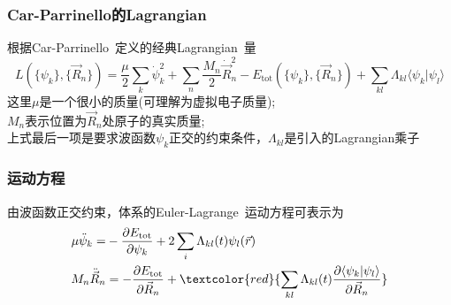 \frame
{
	\frametitle{\textrm{Car-Parrinello}的\textrm{Lagrangian}}
	根据\textrm{Car-Parrinello~}定义的经典\textrm{Lagrangian~}量
	{\fontsize{9.0pt}{5.2pt}\selectfont
	\begin{displaymath}
		L(\{\psi_k\},\{\vec R_n\})=\frac{\mu}2\sum_k\dot{\psi}_k^2+\sum_n\frac{M_n}2\dot{\vec R}_n^2-E_{\mathrm{tot}}(\{\psi_k\},\{\vec R_n\})+\sum_{kl}\Lambda_{kl}\langle\psi_k|\psi_l\rangle
	\end{displaymath}}
	这里$\mu$是一个很小的质量(可理解为虚拟电子质量);\\
	$M_n$表示位置为$\vec R_n$处原子的真实质量;~\\
	上式最后一项是要求波函数$\psi_k$正交的约束条件，$\Lambda_{kl}$是引入的\textrm{Lagrangian}乘子
\vskip 5pt
{\fontsize{7.2pt}{5.2pt}}
}

\frame
{
	\frametitle{运动方程}
由波函数正交约束，体系的\textrm{Euler-Lagrange~}运动方程可表示为
	\begin{displaymath}
		\begin{aligned}
			\mu\ddot{\psi}_k=&-\dfrac{\partial E_{\mathrm{tot}}}{\partial\psi_k}+2\sum_i\Lambda_{kl}(t)\psi_l(\vec r)\\
			M_n\ddot{\vec R}_n&=-\dfrac{\partial E_{\mathrm{tot}}}{\partial\vec R_n}+\textcolor{red}{\sum_{kl}\Lambda_{kl}(t)\dfrac{\partial\langle\psi_k|\psi_l\rangle}{\partial\vec R_n}}
		\end{aligned}
	\end{displaymath}
	{\fontsize{7.2pt}{5.2pt}}
}

